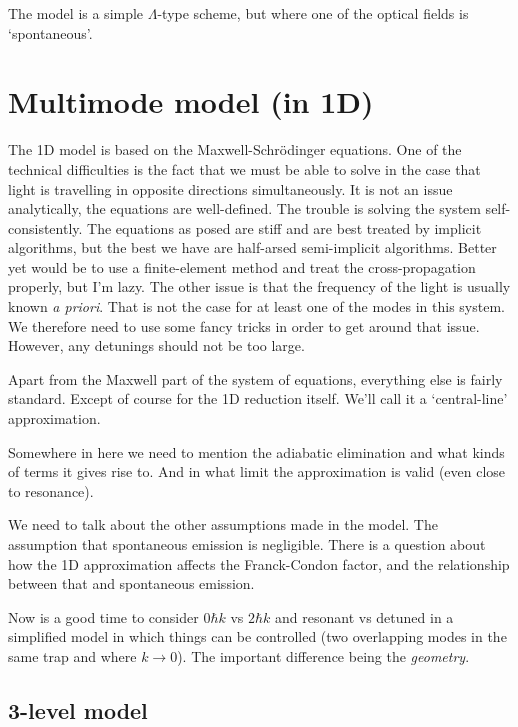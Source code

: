 The model is a simple $\Lambda$-type scheme, but where one of the optical fields is `spontaneous'.

\section{Multimode model (in 1D)}
\label{OpticalPumping:MultimodeModel}

The 1D model is based on the Maxwell-Schrödinger equations.  One of the technical difficulties is the fact that we must be able to solve in the case that light is travelling in opposite directions simultaneously.  It is not an issue analytically, the equations are well-defined.  The trouble is solving the system self-consistently.  The equations as posed are stiff and are best treated by implicit algorithms, but the best we have are half-arsed semi-implicit algorithms. Better yet would be to use a finite-element method and treat the cross-propagation properly, but I'm lazy.  The other issue is that the frequency of the light is usually known \emph{a priori}.  That is not the case for at least one of the modes in this system.  We therefore need to use some fancy tricks in order to get around that issue.  However, any detunings should not be too large.

Apart from the Maxwell part of the system of equations, everything else is fairly standard.  Except of course for the 1D reduction itself.  We'll call it a `central-line' approximation.

Somewhere in here we need to mention the adiabatic elimination and what kinds of terms it gives rise to.  And in what limit the approximation is valid (even close to resonance).

We need to talk about the other assumptions made in the model.  The assumption that spontaneous emission is negligible.  There is a question about how the 1D approximation affects the Franck-Condon factor, and the relationship between that and spontaneous emission.

Now is a good time to consider $0 \hbar k$ vs $2 \hbar k$ and resonant vs detuned in a simplified model in which things can be controlled (two overlapping modes in the same trap and where $k \rightarrow 0$). The important difference being the \emph{geometry}.

\subsection{3-level model}

